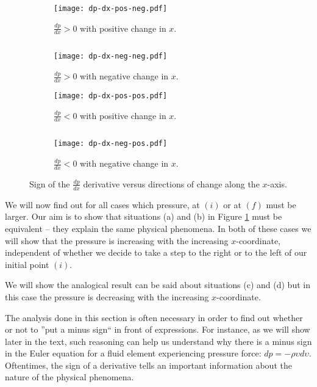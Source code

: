 \begin{figure}[H]
\begin{subfigure}[t]{.46\textwidth}
\centering
\texttt{[image: dp-dx-pos-neg.pdf]}
\caption{$\frac{dp}{dx} > 0$ with positive change in $x$.}
\end{subfigure}
\begin{minipage}[t]{.07\textwidth}
$ $
\vspace*{1.5cm}
\end{minipage}
\begin{subfigure}[t]{.46\textwidth}
\centering
\texttt{[image: dp-dx-neg-neg.pdf]}
\caption{$\frac{dp}{dx} > 0$ with negative change in $x$.}
\end{subfigure}
\begin{subfigure}[t]{.46\textwidth}
\centering
\texttt{[image: dp-dx-pos-pos.pdf]}
\caption{$\frac{dp}{dx} < 0$ with positive change in $x$.}
\end{subfigure}
\begin{minipage}[t]{.08\textwidth}
$ $
\end{minipage}
\begin{subfigure}[t]{.46\textwidth}
\centering
\texttt{[image: dp-dx-neg-pos.pdf]}
\caption{$\frac{dp}{dx} < 0$ with negative change in $x$.}
\end{subfigure}
\caption{Sign of the $\frac{dp}{dx}$ derivative versus directions of change along the $x$-axis.}
\label{fig:dp-dx-signs}
\end{figure}

We will now find out for all cases which pressure, at \textcolor{myblue}{$(i)$} or at \textcolor{myblue}{$(f)$} must be larger. Our aim is to show that situations (a) and (b) in Figure \ref{fig:dp-dx-signs} must be equivalent -- they explain the same physical phenomena. In both of these cases we will show that the pressure is increasing with the increasing $x$-coordinate, independent of whether we decide to take a step to the right or to the left of our initial point \textcolor{myblue}{$(i)$}. 

We will show the analogical result can be said about situations (c) and (d) but in this case the pressure is decreasing with the increasing $x$-coordinate.

The analysis done in this section is often necessary in order to find out whether or not to ''put a minus sign`` in front of expressions. For instance, as we will show later in the text, such reasoning can help us understand why there is a minus sign in the Euler equation for a fluid element experiencing pressure force: $dp = - \rho \upsilon d \upsilon$. Oftentimes, the sign of a derivative tells an important information about the nature of the physical phenomena.

